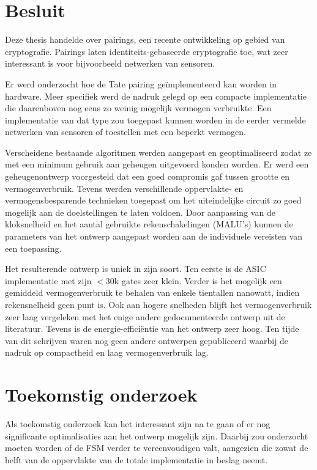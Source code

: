 
\section{Besluit}

Deze thesis handelde over pairings, een recente ontwikkeling op gebied van cryptografie. Pairings laten identiteits-gebaseerde cryptografie toe, wat zeer interessant is voor bijvoorbeeld netwerken van sensoren.

Er werd onderzocht hoe de Tate pairing ge\"implementeerd kan worden in hardware. Meer specifiek werd de nadruk gelegd op een compacte implementatie die daarenboven nog eens zo weinig mogelijk vermogen verbruikte. Een implementatie van dat type zou toegepast kunnen worden in de eerder vermelde netwerken van sensoren of toestellen met een beperkt vermogen.

Verscheidene bestaande algoritmen werden aangepast en geoptimaliseerd zodat ze met een minimum gebruik aan geheugen uitgevoerd konden worden. Er werd een geheugenontwerp voorgesteld dat een goed compromis gaf tussen grootte en vermogenverbruik. Tevens werden verschillende oppervlakte- en vermogensbesparende technieken toegepast om het uiteindelijke circuit zo goed mogelijk aan de doelstellingen te laten voldoen. Door aanpassing van de kloksnelheid en het aantal gebruikte rekenschakelingen (MALU's) kunnen de parameters van het ontwerp aangepast worden aan de individuele vereisten van een toepassing.

Het resulterende ontwerp is uniek in zijn soort. Ten eerste is de ASIC implementatie met zijn $<$30k gates zeer klein. Verder is het mogelijk een gemiddeld vermogenverbruik te behalen van enkele tientallen nanowatt, indien rekensnelheid geen punt is. Ook aan hogere snelheden blijft het vermogenverbruik zeer laag vergeleken met het enige andere gedocumenteerde ontwerp uit de literatuur. Tevens is de energie-effici\"entie van het ontwerp zeer hoog. Ten tijde van dit schrijven waren nog geen andere ontwerpen gepubliceerd waarbij de nadruk op compactheid en laag vermogenverbruik lag.

\section{Toekomstig onderzoek}

Als toekomstig onderzoek kan het interessant zijn na te gaan of er nog significante optimalisaties aan het ontwerp mogelijk zijn. Daarbij zou onderzocht moeten worden of de FSM verder te vereenvoudigen valt, aangezien die zowat de helft van de oppervlakte van de totale implementatie in beslag neemt.

